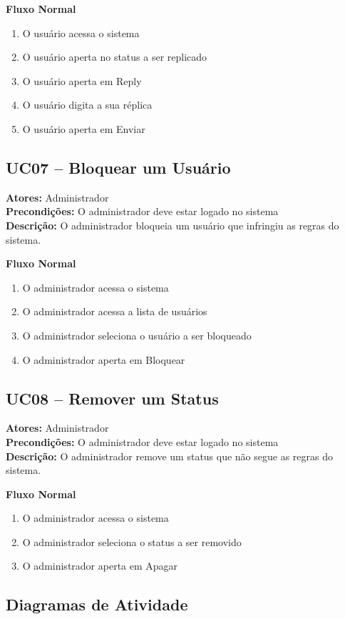 \documentclass[12pt]{article}
\begin{document}
\textbf{Fluxo Normal}
\begin{enumerate}
  \item O usuário acessa o sistema
  \item O usuário aperta no status a ser replicado
  \item O usuário aperta em Reply
  \item O usuário digita a sua réplica
  \item O usuário aperta em Enviar
\end{enumerate}

\subsection{UC07 -- Bloquear um Usuário}
\textbf{Atores:} Administrador \\
\textbf{Precondições:} O administrador deve estar logado no sistema \\
\textbf{Descrição:} O administrador bloqueia um usuário que infringiu as regras do sistema.

\textbf{Fluxo Normal}
\begin{enumerate} \item O administrador acessa o sistema
  \item O administrador acessa a lista de usuários
  \item O administrador seleciona o usuário a ser bloqueado
  \item O administrador aperta em Bloquear
\end{enumerate}

\subsection{UC08 -- Remover um Status}
\textbf{Atores:} Administrador \\
\textbf{Precondições:} O administrador deve estar logado no sistema \\
\textbf{Descrição:} O administrador remove um status que não segue as regras do sistema.

\textbf{Fluxo Normal}
\begin{enumerate}
  \item O administrador acessa o sistema
  \item O administrador seleciona o status a ser removido
  \item O administrador aperta em Apagar
\end{enumerate}

\subsection{Diagramas de Atividade}
\end{document}
